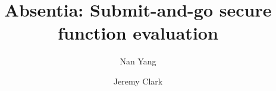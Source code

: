 \documentclass[envcountsect]{llncs}
\begin{document}
\frontmatter
\mainmatter

\title{\Large \bf Absentia: Submit-and-go secure function evaluation}


\author{
	Nan Yang \and Jeremy Clark
	}


\maketitle












\clearpage
\appendix
\end{document}
